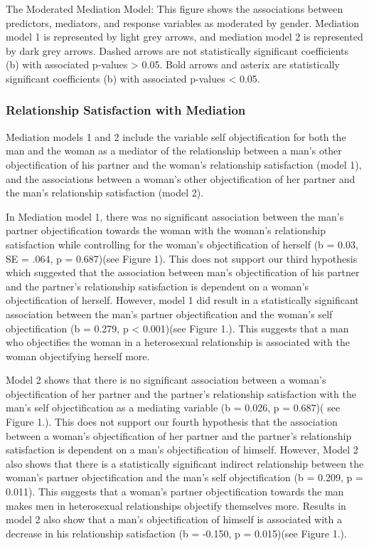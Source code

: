 \documentclass[
  english,
  man]{apa6}
\begin{document}
The Moderated Mediation Model: This figure shows the associations between predictors, mediators, and response variables as moderated by gender. Mediation model 1 is represented by light grey arrows, and mediation model 2 is represented by dark grey arrows. Dashed arrows are not statistically significant coefficients (b) with associated p-values \textgreater{} 0.05. Bold arrows and asterix are statistically significant coefficients (b) with associated p-values \textless{} 0.05.

\hypertarget{relationship-satisfaction-with-mediation}{%
\subsubsection{Relationship Satisfaction with Mediation}\label{relationship-satisfaction-with-mediation}}

Mediation models 1 and 2 include the variable self objectification for both the man and the woman as a mediator of the relationship between a man's other objectification of his partner and the woman's relationship satisfaction (model 1), and the associations between a woman's other objectification of her partner and the man's relationship satisfaction (model 2).

In Mediation model 1, there was no significant association between the man's partner objectification towards the woman with the woman's relationship satisfaction while controlling for the woman's objectification of herself (b = 0.03, SE = .064, p = 0.687)(see Figure 1). This does not support our third hypothesis which suggested that the association between man's objectification of his partner and the partner's relationship satisfaction is dependent on a woman's objectification of herself. However, model 1 did result in a statistically significant association between the man's partner objectification and the woman's self objectification (b = 0.279, p \textless{} 0.001)(see Figure 1.). This suggests that a man who objectifies the woman in a heterosexual relationship is associated with the woman objectifying herself more.

Model 2 shows that there is no significant association between a woman's objectification of her partner and the partner's relationship satisfaction with the man's self objectification as a mediating variable (b = 0.026, p = 0.687)( see Figure 1.). This does not support our fourth hypothesis that the association between a woman's objectification of her partner and the partner's relationship satisfaction is dependent on a man's objectification of himself. However, Model 2 also shows that there is a statistically significant indirect relationship between the woman's partner objectification and the man's self objectification (b = 0.209, p = 0.011). This suggests that a woman's partner objectification towards the man makes men in heterosexual relationships objectify themselves more. Results in model 2 also show that a man's objectification of himself is associated with a decrease in his relationship satisfaction (b = -0.150, p = 0.015)(see Figure 1.).
\end{document}
